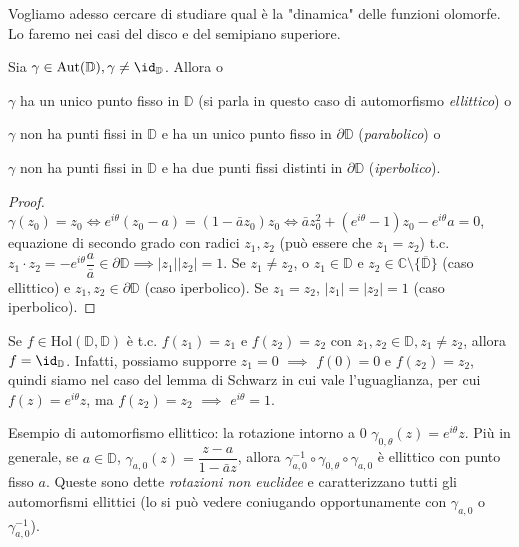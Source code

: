 Vogliamo adesso cercare di studiare qual è la "dinamica" delle funzioni olomorfe. Lo faremo nei casi del disco e del semipiano superiore.

\begin{prop}
  Sia $\gamma \in \text{Aut}(\mathbb{D}), \gamma \not=\id_{\mathbb{D}}$. Allora o
  \begin{nlist}
    \item $\gamma$ ha un unico punto fisso in $\mathbb{D}$ (si parla in questo caso di automorfismo \textit{ellittico}) o
    \item $\gamma$ non ha punti fissi in $\mathbb{D}$ e ha un unico punto fisso in $\partial\mathbb{D}$ (\textit{parabolico}) o
    \item $\gamma$ non ha punti fissi in $\mathbb{D}$ e ha due punti fissi distinti in $\partial\mathbb{D}$ (\textit{iperbolico}).
  \end{nlist}
\end{prop}

\begin{proof}
  $\gamma(z_0)=z_0 \iff e^{i\theta}(z_0-a)=(1-\bar{a}z_0)z_0 \iff \bar{a}z_0^2+(e^{i\theta}-1)z_0-e^{i\theta}a=0$, equazione di secondo grado con radici $z_1, z_2$ (può essere che $z_1=z_2$) t.c.
  $z_1 \cdot z_2=-e^{i\theta}\dfrac{a}{\bar{a}} \in \partial\mathbb{D} \implies |z_1||z_2|=1$.
  Se $z_1 \not=z_2$, o $z_1 \in \mathbb{D}$ e $z_2 \in \mathbb{C} \setminus \{\overline{\mathbb{D}}\}$ (caso ellittico) e $z_1, z_2 \in \partial\mathbb{D}$ (caso iperbolico). Se $z_1=z_2$, $|z_1|=|z_2|=1$ (caso iperbolico).
\end{proof}

\begin{oss}
  Se $f \in \text{Hol}(\mathbb{D}, \mathbb{D})$ è t.c. $f(z_1)=z_1$ e $f(z_2)=z_2$ con $z_1, z_2 \in \mathbb{D}, z_1 \not=z_2$, allora $f=\id_{\mathbb{D}}$.
  Infatti, possiamo supporre $z_1=0$ $\implies$ $f(0)=0$ e $f(z_2)=z_2$, quindi siamo nel caso del lemma di Schwarz in cui vale l'uguaglianza, per cui $f(z)=e^{i\theta}z$, ma $f(z_2)=z_2$ $\implies$ $e^{i\theta}=1$.
\end{oss}

\begin{ex}
  Esempio di automorfismo ellittico: la rotazione intorno a $0$ $\gamma_{0, \theta}(z)=e^{i\theta}z$. Più in generale, se $a \in \mathbb{D}$, $\gamma_{a, 0}(z)=\dfrac{z-a}{1-\bar{a}z}$, allora $\gamma_{a, 0}^{-1} \circ \gamma_{0, \theta} \circ \gamma_{a, 0}$ è ellittico con punto fisso $a$.
  Queste sono dette \textit{rotazioni non euclidee} e caratterizzano tutti gli automorfismi ellittici (lo si può vedere coniugando opportunamente con $\gamma_{a, 0}$ o $\gamma_{a, 0}^{-1}$).
\end{ex}

